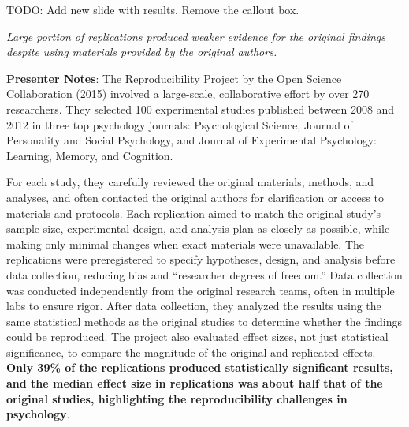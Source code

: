 \documentclass[
  letterpaper,
  DIV=11,
  numbers=noendperiod]{scrartcl}
\begin{document}
TODO: Add new slide with results. Remove the callout box.

\begin{tcolorbox}[enhanced jigsaw, arc=.35mm, bottomrule=.15mm, bottomtitle=1mm, breakable, colback=white, colbacktitle=quarto-callout-important-color!10!white, colframe=quarto-callout-important-color-frame, coltitle=black, left=2mm, leftrule=.75mm, opacityback=0, opacitybacktitle=0.6, rightrule=.15mm, title=\textcolor{quarto-callout-important-color}{\faExclamation}\hspace{0.5em}{What did they find?}, titlerule=0mm, toprule=.15mm, toptitle=1mm]

\emph{Large portion of replications produced weaker evidence for the
original findings despite using materials provided by the original
authors.}

\end{tcolorbox}

\textbf{Presenter Notes}: The Reproducibility Project by the Open
Science Collaboration (2015) involved a large-scale, collaborative
effort by over 270 researchers. They selected 100 experimental studies
published between 2008 and 2012 in three top psychology journals:
Psychological Science, Journal of Personality and Social Psychology, and
Journal of Experimental Psychology: Learning, Memory, and Cognition.

For each study, they carefully reviewed the original materials, methods,
and analyses, and often contacted the original authors for clarification
or access to materials and protocols. Each replication aimed to match
the original study's sample size, experimental design, and analysis plan
as closely as possible, while making only minimal changes when exact
materials were unavailable. The replications were preregistered to
specify hypotheses, design, and analysis before data collection,
reducing bias and ``researcher degrees of freedom.'' Data collection was
conducted independently from the original research teams, often in
multiple labs to ensure rigor. After data collection, they analyzed the
results using the same statistical methods as the original studies to
determine whether the findings could be reproduced. The project also
evaluated effect sizes, not just statistical significance, to compare
the magnitude of the original and replicated effects. \textbf{Only 39\%
of the replications produced statistically significant results, and the
median effect size in replications was about half that of the original
studies, highlighting the reproducibility challenges in psychology}.
\end{document}
